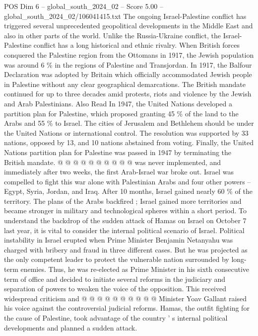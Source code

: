 \begin{textsample}{POS Dim 6 – global\_south\_2024\_02 – Score 5.00 – global\_south\_2024\_02/106041415.txt}  \label{ex:f6_pos_183}
The ongoing Israel-Palestine conflict has triggered several unprecedented geopolitical developments in the Middle East and also in other parts of the world.
Unlike the Russia-Ukraine conflict, the Israel-Palestine conflict has a long historical and ethnic rivalry.
When British forces conquered the Palestine region from the Ottomans in 1917, the Jewish population was around 6 \% in the regions of Palestine and Transjordan.
In 1917, the Balfour Declaration was adopted by Britain which officially accommodated Jewish people in Palestine without any clear geographical demarcations.
The British mandate continued for up to three decades amid protests, riots and violence by the Jewish and Arab Palestinians.
Also Read In 1947, the United Nations developed a partition plan for Palestine, which proposed granting 45 \% of the land to the Arabs and 55 \% to Israel.
The cities of Jerusalem and Bethlehem should be under the United Nations or international control.
The resolution was supported by 33 nations, opposed by 13, and 10 nations abstained from voting.
Finally, the United Nations partition plan for Palestine was passed in 1947 by terminating the British mandate. @ @ @ @ @ @ @ @ @ @ was never implemented, and immediately after two weeks, the first Arab-Israel war broke out.
Israel was compelled to fight this war alone with Palestinian Arabs and four other powers -- Egypt, Syria, Jordan, and Iraq.
After 10 months, Israel gained nearly 60 \% of the territory.
The plans of the Arabs backfired ; Israel gained more territories and became stronger in military and technological spheres within a short period.
To understand the backdrop of the sudden attack of Hamas on Israel on October 7 last year, it is vital to consider the internal political scenario of Israel.
Political instability in Israel erupted when Prime Minister Benjamin Netanyahu was charged with bribery and fraud in three different cases.
But he was projected as the only competent leader to protect the vulnerable nation surrounded by long-term enemies.
Thus, he was re-elected as Prime Minister in his sixth consecutive term of office and decided to initiate several reforms in the judiciary and separation of powers to weaken the voice of the opposition.
This received widespread criticism and @ @ @ @ @ @ @ @ @ @ Minister Yoav Gallant raised his voice against the controversial judicial reforms.
Hamas, the outfit fighting for the cause of Palestine, took advantage of the country ' s internal political developments and planned a sudden attack.

\end{textsample}
